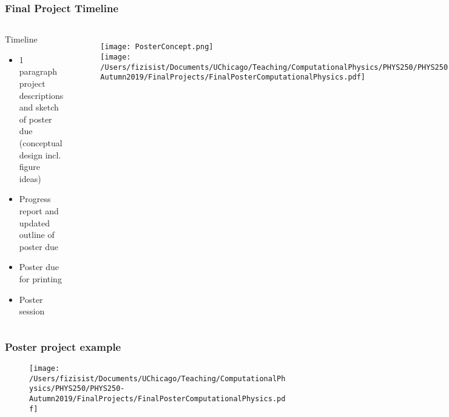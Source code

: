 \documentclass[hyperref={colorlinks=true}]{beamer}
\begin{document}

\begin{frame}%
  \frametitle{Final Project Timeline}

  \begin{columns}
  
    
  \begin{ucblock}{Timeline}
    \begin{itemize}
      \item {} 1 paragraph project descriptions and sketch of poster due (conceptual design incl. figure ideas)
      \item {} Progress report and updated outline of poster due
      \item {} Poster due for printing
      \item {} Poster session
    \end{itemize}
  \end{ucblock}
  
  
  \vspace{-1cm}
  
  \begin{figure}
    \texttt{[image: PosterConcept.png]}\\
    \texttt{[image: /Users/fizisist/Documents/UChicago/Teaching/ComputationalPhysics/PHYS250/PHYS250-Autumn2019/FinalProjects/FinalPosterComputationalPhysics.pdf]}\\
  \end{figure}

  
  \end{columns}

  
\end{frame}


\begin{frame}%
  \frametitle{Poster project example}
  
  \begin{figure}
    \texttt{[image: /Users/fizisist/Documents/UChicago/Teaching/ComputationalPhysics/PHYS250/PHYS250-Autumn2019/FinalProjects/FinalPosterComputationalPhysics.pdf]}
  \end{figure}
  
\end{frame}
\end{document}
